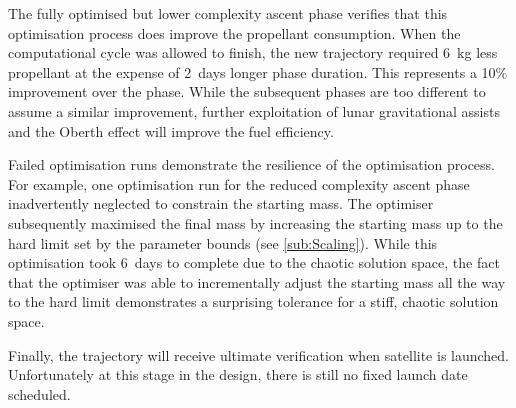 

The fully optimised but lower complexity ascent phase verifies that this optimisation process does improve the propellant consumption. When the computational cycle was allowed to finish, the new trajectory required 6~kg less propellant at the expense of 2~days longer phase duration. This represents a 10\% improvement over the phase. While the subsequent phases are too different to assume a similar improvement, further exploitation of lunar gravitational assists and the Oberth effect will improve the fuel efficiency.

Failed optimisation runs demonstrate the resilience of the optimisation process. For example, one optimisation run for the reduced complexity ascent phase inadvertently neglected to constrain the starting mass. The optimiser subsequently maximised the final mass by increasing the starting mass up to the hard limit set by the parameter bounds (see \autoref{sub:Scaling}). While this optimisation took 6~days to complete due to the chaotic solution space, the fact that the optimiser was able to incrementally adjust the starting mass all the way to the hard limit demonstrates a surprising tolerance for a stiff, chaotic solution space.


Finally, the trajectory will receive ultimate verification when satellite is launched. Unfortunately at this stage in the design, there is still no fixed launch date scheduled.





